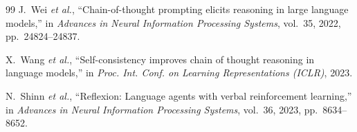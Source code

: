 \documentclass[conference]{IEEEtran}
\begin{document}
\begin{thebibliography}{99}
 J.~Wei \emph{et al.}, ``Chain-of-thought prompting elicits reasoning in large language models,'' in \emph{Advances in Neural Information Processing Systems}, vol.~35, 2022, pp.~24824--24837.

 X.~Wang \emph{et al.}, ``Self-consistency improves chain of thought reasoning in language models,'' in \emph{Proc. Int. Conf. on Learning Representations (ICLR)}, 2023.

 N.~Shinn \emph{et al.}, ``Reflexion: Language agents with verbal reinforcement learning,'' in \emph{Advances in Neural Information Processing Systems}, vol.~36, 2023, pp.~8634--8652.

\end{thebibliography}
\end{document}
